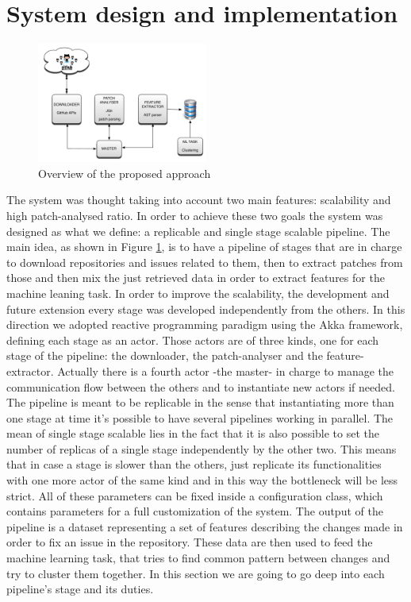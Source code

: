\section{System design and implementation}
\label{sec:implementation}

\begin{figure}
  \centering
  \includegraphics[width=0.5\textwidth]{pictures/overallArch.pdf}
  \caption{Overview of the proposed approach}
  \label{fig:overall}
\end{figure}


The system was thought taking into account two main features: scalability and high patch-analysed ratio. In order to achieve these two goals the system was designed as what we define: a replicable and single stage scalable pipeline. The main idea, as shown in Figure \ref{fig:overall}, is to have a pipeline of stages that are in charge to download repositories and issues related to them, then to extract patches from those and then mix the just retrieved data in order to extract features for the machine leaning task. In order to improve the scalability, the development and future extension every stage was developed independently from the others. In this direction we adopted reactive programming paradigm using the Akka framework, defining each stage as an actor. Those actors are of three kinds, one for each stage of the pipeline: the downloader, the patch-analyser and the feature-extractor. Actually there is a fourth actor -the master- in charge to manage the communication flow between the others and to instantiate new actors if needed. The pipeline is meant to be replicable in the sense that instantiating more than one stage at time it's possible to have several pipelines working in parallel. The mean of single stage scalable lies in the fact that it is also possible to set the number of replicas of a single stage independently by the other two. This means that in case a stage is slower than the others, just replicate its functionalities with one more actor of the same kind and in this way the bottleneck will be less strict. All of these parameters can be fixed inside a configuration class, which contains parameters for a full customization of the system. The output of the pipeline is a dataset representing a set of features describing the changes made in order to fix an issue in the repository. These data are then used to feed the machine learning task, that tries to find common pattern between changes and try to cluster them together. In this section we are going to go deep into each pipeline's stage and its duties. 

